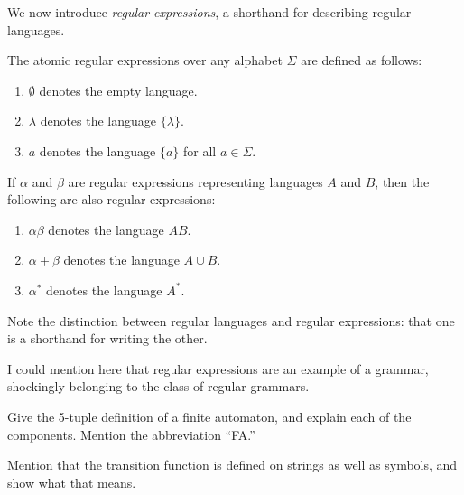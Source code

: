 \documentclass{bcthesis}
\renewcommand{\meo}{}
\begin{document}
	We now introduce \textit{regular expressions}, a shorthand for describing regular languages.


	\begin{definition}
		The atomic regular expressions over any alphabet $\Sigma$ are defined as follows:
		\begin{enumerate}[label=(\roman*), itemsep = -0.3 ex]
			\item $\emptyset$ denotes the empty language.
			\item $\lambda$ denotes the language $\{ \lambda \}$.
			\item $a$ denotes the language $\{ a \}$ for all $a \in \Sigma$.
		\end{enumerate}

		If $\alpha$ and $\beta$ are regular expressions representing languages $A$ and $B$, then the following are also regular expressions:
		\begin{enumerate}[label=(\roman*), itemsep = -0.3 ex]
			\item $\alpha \beta$ denotes the language $AB$.
			\item $\alpha + \beta$ denotes the language $A \cup B$.
			\item $\alpha^*$ denotes the language $A^*$.
		\end{enumerate}
	\end{definition}

	\begin{remark}
		Note the distinction between regular languages and regular expressions: that one is a shorthand for writing the other.
	\end{remark}

	\meo{
		I could mention here that regular expressions are an example of a grammar, shockingly belonging to the class of regular grammars.
	}


\label{ch:finite_automata}


	\begin{definition}
		Give the 5-tuple definition of a finite automaton, and explain each of the components.
		Mention the abbreviation ``FA.''
	\end{definition}

	\begin{remark}
		Mention that the transition function is defined on strings as well as symbols, and show what that means.
	\end{remark}
\end{document}
